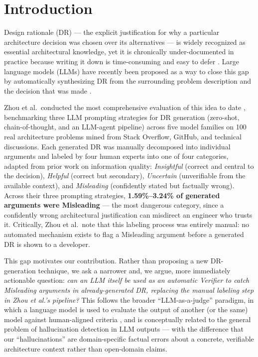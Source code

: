 \documentclass[runningheads]{llncs}
\begin{document}
\section{Introduction}
\label{sec:intro}

Design rationale (DR) --- the explicit justification for why a particular architecture decision was chosen over its alternatives --- is widely recognized as essential architectural knowledge, yet it is chronically under-documented in practice because writing it down is time-consuming and easy to defer \cite{zhou2025llm}. Large language models (LLMs) have recently been proposed as a way to close this gap by automatically synthesizing DR from the surrounding problem description and the decision that was made \cite{zhou2025llm,dhar2024llm,diazpace2024archmind}.

Zhou et al.\ conducted the most comprehensive evaluation of this idea to date \cite{zhou2025llm}, benchmarking three LLM prompting strategies for DR generation (zero-shot, chain-of-thought, and an LLM-agent pipeline) across five model families on 100 real architecture problems mined from Stack Overflow, GitHub, and technical discussions. Each generated DR was manually decomposed into individual arguments and labeled by four human experts into one of four categories, adapted from prior work on information quality: \emph{Insightful} (correct and central to the decision), \emph{Helpful} (correct but secondary), \emph{Uncertain} (unverifiable from the available context), and \emph{Misleading} (confidently stated but factually wrong). Across their three prompting strategies, \textbf{1.59\%--3.24\% of generated arguments were Misleading} --- the most dangerous category, since a confidently wrong architectural justification can misdirect an engineer who trusts it. Critically, Zhou et al.\ note that this labeling process was entirely manual: no automated mechanism exists to flag a Misleading argument before a generated DR is shown to a developer.

This gap motivates our contribution. Rather than proposing a new DR-generation technique, we ask a narrower and, we argue, more immediately actionable question: \emph{can an LLM itself be used as an automatic Verifier to catch Misleading arguments in already-generated DR, replacing the manual labeling step in Zhou et al.'s pipeline?} This follows the broader ``LLM-as-a-judge'' paradigm, in which a language model is used to evaluate the output of another (or the same) model against human-aligned criteria \cite{zheng2023judging}, and is conceptually related to the general problem of hallucination detection in LLM outputs \cite{huang2025survey,farquhar2024semantic,manakul2023selfcheckgpt} --- with the difference that our ``hallucinations'' are domain-specific factual errors about a concrete, verifiable architecture context rather than open-domain claims.
\end{document}
